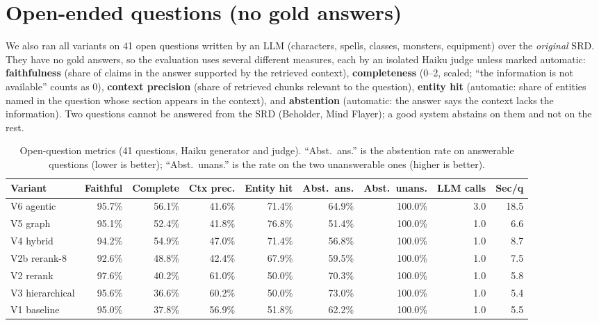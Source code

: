 \documentclass[11pt,a4paper]{article}
\begin{document}
\section{Open-ended questions (no gold answers)}
We also ran all variants on 41 open questions written by an LLM (characters, spells, classes, monsters, equipment) over the \emph{original} SRD. They have no gold answers, so the evaluation uses several different measures, each by an isolated Haiku judge unless marked automatic: \textbf{faithfulness} (share of claims in the answer supported by the retrieved context), \textbf{completeness} (0--2, scaled; ``the information is not available'' counts as 0), \textbf{context precision} (share of retrieved chunks relevant to the question), \textbf{entity hit} (automatic: share of entities named in the question whose section appears in the context), and \textbf{abstention} (automatic: the answer says the context lacks the information). Two questions cannot be answered from the SRD (Beholder, Mind Flayer); a good system abstains on them and not on the rest.

\begin{table}[h]\centering\footnotesize
\caption{Open-question metrics (41 questions, Haiku generator and judge). ``Abst.\ ans.'' is the abstention rate on answerable questions (lower is better); ``Abst.\ unans.'' is the rate on the two unanswerable ones (higher is better).}
\begin{tabular}{@{}lrrrrrrrr@{}}\toprule
Variant & Faithful & Complete & Ctx prec. & Entity hit & Abst.\ ans. & Abst.\ unans. & LLM calls & Sec/q\\\midrule
V6 agentic & 95.7\% & 56.1\% & 41.6\% & 71.4\% & 64.9\% & 100.0\% & 3.0 & 18.5 \\
V5 graph & 95.1\% & 52.4\% & 41.8\% & 76.8\% & 51.4\% & 100.0\% & 1.0 & 6.6 \\
V4 hybrid & 94.2\% & 54.9\% & 47.0\% & 71.4\% & 56.8\% & 100.0\% & 1.0 & 8.7 \\
V2b rerank-8 & 92.6\% & 48.8\% & 42.4\% & 67.9\% & 59.5\% & 100.0\% & 1.0 & 7.5 \\
V2 rerank & 97.6\% & 40.2\% & 61.0\% & 50.0\% & 70.3\% & 100.0\% & 1.0 & 5.8 \\
V3 hierarchical & 95.6\% & 36.6\% & 60.2\% & 50.0\% & 73.0\% & 100.0\% & 1.0 & 5.4 \\
V1 baseline & 95.0\% & 37.8\% & 56.9\% & 51.8\% & 62.2\% & 100.0\% & 1.0 & 5.5 \\
\bottomrule\end{tabular}
\end{table}
\end{document}
